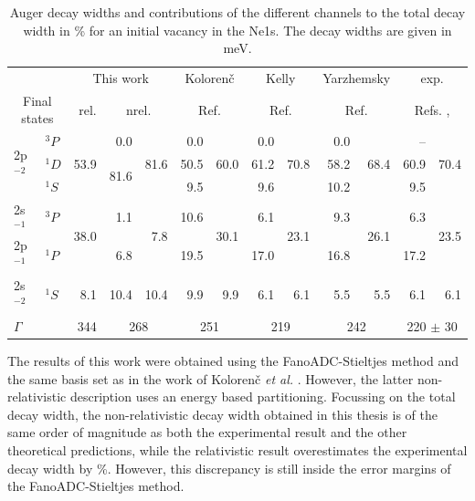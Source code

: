 \begin{table}[h]
  \centering
  \caption{Auger decay widths and contributions of the different channels to
           the total decay width in \% 
           for an initial vacancy in the Ne1s. The decay widths are given in
           \unit[]{meV}.}
  \small
  \begin{tabular}{llr|rr|rr|rr|rr|rr}
   \toprule
    & & \multicolumn{3}{c}{This work} & \multicolumn{2}{c}{Koloren\v{c}} & \multicolumn{2}{c}{Kelly} & \multicolumn{2}{c}{Yarzhemsky} & \multicolumn{2}{c}{exp.}\\
   \multicolumn{2}{c}{Final states} & {rel.} & \multicolumn{2}{c|}{nrel.} & \multicolumn{2}{c|}{Ref.\cite{Kolorenc11}} & \multicolumn{2}{c|}{Ref.\cite{Kelly75}} & \multicolumn{2}{c|}{Ref.\cite{Yarzhemsky02}} & \multicolumn{2}{c}{Refs. \cite{Albiez90}, \cite{Avaldi95}}\\
   \midrule
   \multirow{3}{*}{2p$^{-2}$} & $^3P$   & \multirow{3}{*}{53.9} & 0.0 & \multirow{3}{*}{81.6} &  0.0 & \multirow{3}{*}{60.0} &  0.0 & \multirow{3}{*}{70.8} &  0.0 & \multirow{3}{*}{68.4} &  --  & \multirow{3}{*}{70.4}\\
                              & $^1D$      & & \multirow{2}{*}{81.6} & & 50.5 & & 61.2 & & 58.2 & & 60.9&\\
                              & $^1S$      & &  & &  9.5 & &  9.6 & & 10.2 & &  9.5&\\
   \midrule
 \multirow{2}{*}{2s$^{-1}$2p$^{-1}$} & $^3P$     & \multirow{2}{*}{38.0} & 1.1 & \multirow{2}{*}{7.8} & 10.6 & \multirow{2}{*}{30.1} &  6.1 & \multirow{2}{*}{23.1} &  9.3 & \multirow{2}{*}{26.1} &  6.3 & \multirow{2}{*}{23.5}\\
                              & $^1P$ &       &  6.8 & & 19.5 & & 17.0 & & 16.8 & & 17.2&\\
   \midrule
      2s$^{-2}$               & $^1S$ &       8.1 & 10.4 & 10.4 &  9.9 & 9.9 &  6.1 & 6.1 &  5.5 & 5.5 &  6.1& 6.1\\
   \midrule
   $\Gamma$  & & {344}  & \multicolumn{2}{c|}{268} & \multicolumn{2}{c|}{251} & \multicolumn{2}{c|}{219} & \multicolumn{2}{c|}{242} & \multicolumn{2}{c}{220 $\pm$ 30}\\
   \bottomrule
  \end{tabular}
  \label{table:Ne_gammas}
\end{table}

The results of this work were obtained using the FanoADC-Stieltjes method and
the same basis set as in the work of  Koloren\v{c} \textit{et al.}
\cite{Kolorenc11}. However, the latter non-relativistic description uses an
energy based partitioning.
Focussing on the total decay width, the non-relativistic decay width
obtained in this thesis is of the same order of magnitude
as both the experimental result
and the other theoretical predictions, while the relativistic result
overestimates the experimental decay width by \unit[56]{\%}. However, this
discrepancy is still inside the error margins of the FanoADC-Stieltjes method.


